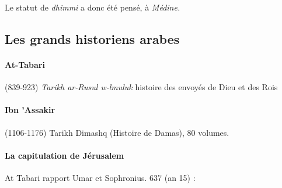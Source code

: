  Le statut de \textit{dhimmi} a donc été pensé, à \textit{Médine.}

 \subsection{Les grands historiens arabes}

 \paragraph{At-Tabari} (839-923) \textit{Tarikh ar-Rusul w-lmuluk} histoire des envoyés de Dieu et des Rois

 \paragraph{Ibn 'Assakir} (1106-1176) Tarikh Dimashq (Histoire de Damas), 80 volumes. 


\paragraph{La capitulation de Jérusalem} At Tabari rapport Umar et Sophronius. 
 637 (an 15) : 
 
